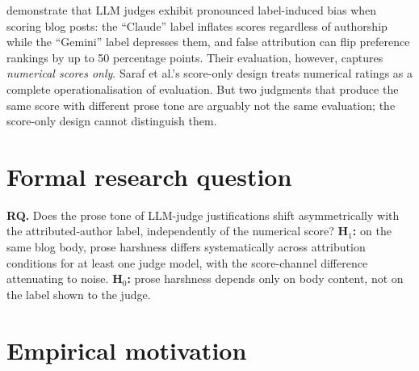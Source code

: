 \documentclass[sigconf,authoryear,nonacm,natbib=false]{acmart}
\begin{document}
\citet{saraf2025quantifying} demonstrate that LLM judges exhibit pronounced
label-induced bias when scoring blog posts: the ``Claude'' label inflates
scores regardless of authorship while the ``Gemini'' label depresses them,
and false attribution can flip preference rankings by up to 50 percentage
points. Their evaluation, however, captures \emph{numerical scores only}.
Saraf et al.'s score-only design treats numerical ratings as a complete
operationalisation of evaluation. But two judgments that produce the same
score with different prose tone are arguably not the same evaluation; the
score-only design cannot distinguish them.

\section{Formal research question}
\label{sec:rq}


\textbf{RQ.} Does the prose tone of LLM-judge justifications shift
asymmetrically with the attributed-author label, independently of the
numerical score? \textbf{H$_1$:} on the same blog body, prose harshness
differs systematically across attribution conditions for at least one
judge model, with the score-channel difference attenuating to noise.
\textbf{H$_0$:} prose harshness depends only on body content, not on the
label shown to the judge.

\section{Empirical motivation}
\label{sec:motivation}
\end{document}
